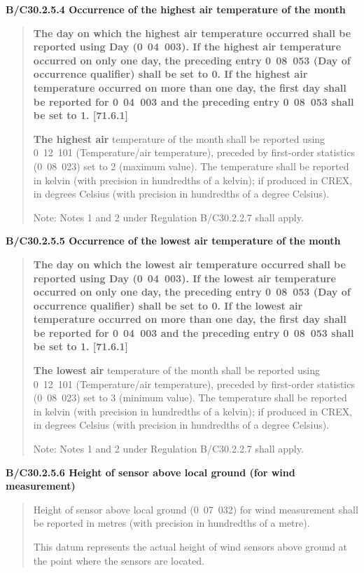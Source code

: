 \textbf{B/C30.2.5.4 Occurrence of the highest air temperature of the month}

\begin{quote}
\textbf{The day on which the highest air temperature occurred shall be reported using Day (0}~\textbf{04~003). If the highest air temperature occurred on only one day, the preceding entry 0}~\textbf{08~053 (Day of occurrence qualifier) shall be set to 0. If the highest air temperature occurred on more than one day, the first day shall be reported for 0}~\textbf{04~003 and the preceding entry 0}~\textbf{08~053 shall be set to 1. {[}71.6.1{]}}

\textbf{The highest air} temperature of the month shall be reported using 0~12~101 (Temperature/air temperature), preceded by first-order statistics (0~08~023) set to 2 (maximum value). The temperature shall be reported in kelvin (with precision in hundredths of a kelvin); if produced in CREX, in degrees Celsius (with precision in hundredths of a degree Celsius).

Note: Notes 1 and 2 under Regulation B/C30.2.2.7 shall apply.
\end{quote}

\textbf{B/C30.2.5.5 Occurrence of the lowest air temperature of the month}

\begin{quote}
\textbf{The day on which the lowest air temperature occurred shall be reported using Day (0}~\textbf{04~003). If the lowest air temperature occurred on only one day, the preceding entry 0}~\textbf{08~053 (Day of occurrence qualifier) shall be set to 0. If the lowest air temperature occurred on more than one day, the first day shall be reported for 0}~\textbf{04~003 and the preceding entry 0}~\textbf{08~053 shall be set to 1. {[}71.6.1{]}}

\textbf{The lowest air} temperature of the month shall be reported using 0~12~101 (Temperature/air temperature), preceded by first-order statistics (0~08~023) set to 3 (minimum value). The temperature shall be reported in kelvin (with precision in hundredths of a kelvin); if produced in CREX, in degrees Celsius (with precision in hundredths of a degree Celsius).

Note: Notes 1 and 2 under Regulation B/C30.2.2.7 shall apply.
\end{quote}

\textbf{B/C30.2.5.6 Height of sensor above local ground (for wind measurement)}

\begin{quote}
Height of sensor above local ground (0~07~032) for wind measurement shall be reported in metres (with precision in hundredths of a metre).

This datum represents the actual height of wind sensors above ground at the point where the sensors are located.
\end{quote}


